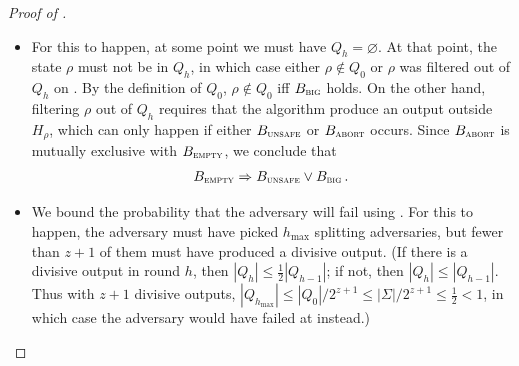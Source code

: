 \documentclass[10pt,a4paper]{article}
\theoremstyle{definition}
\theoremstyle{remark}
\renewcommand{\emptyset}{\varnothing}
\newcommand{\unsafesc}{\textsc{unsafe}\xspace}
\newcommand{\emptysc}{\textsc{empty}\xspace}
\newcommand{\timeoutsc}{\textsc{timeout}\xspace}
\newcommand{\bigsc}{\textsc{big}\xspace}
\newcommand{\abortsc}{\textsc{abort}\xspace}
\begin{document}
\begin{itemize}
\begin{itemize}
\begin{proof}[Proof of ]
\begin{itemize}
\begin{itemize}[wide, font=\bfseries]
  \item[(Event $B_{\emptysc}$)~]
    For this to happen, at some point we must have $Q_h = \emptyset$. At that
    point, the state $\rho$ must not be in $Q_h$, in which case either $\rho
    \notin Q_0$ or $\rho$ was filtered out of $Q_h$ on .
    By the definition of $Q_0$, $\rho \notin Q_0$ iff $B_{\bigsc}$ holds. On
    the other hand, filtering $\rho$ out of $Q_h$ requires that the algorithm
    produce an output outside $H_{\rho}$, which can only happen if either
    $B_{\unsafesc}$ or $B_{\abortsc}$ occurs. Since $B_{\abortsc}$ is mutually
    exclusive with $B_{\emptysc}$, we conclude that
    \begin{align}
      B_{\emptysc} \Rightarrow B_{\unsafesc} \lor B_{\bigsc} \,. \label{eq:b-empty-bound}
    \end{align}
  
  \item[(Event $B_{\timeoutsc}$)~]
    We bound the probability that the adversary will fail using
    . For this to
    happen, the adversary must have picked $h_{\max}$ splitting adversaries,
    but fewer than $z+1$ of them must have
    produced a divisive output. (If there is a divisive output in round $h$,
    then $|Q_h| \le \frac{1}{2} |Q_{h-1}|$; if not, then $|Q_h| \le
    |Q_{h-1}|$. Thus with $z+1$ divisive outputs, $|Q_{h_{\max}}| \le |Q_0| /
    2^{z+1} \le |\Sigma|/2^{z+1} \le \frac{1}{2} < 1$, in which case
    the adversary would have failed at  instead.)
  

\end{itemize}
\end{itemize}
\end{proof}
\end{itemize}
\end{itemize}
\end{document}
